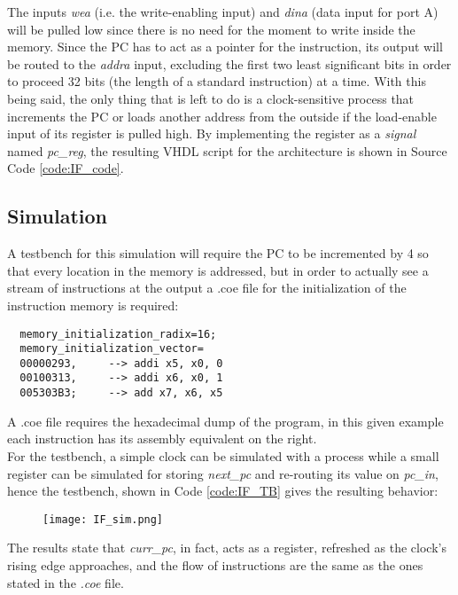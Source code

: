 The inputs \emph{wea} (i.e. the write-enabling input) and \emph{dina} (data input for port A) will be pulled low since there is no need for the moment to write inside the memory. 
Since the PC has to act as a pointer for the instruction, its output will be routed to the \emph{addra} input, excluding the first two least significant bits in order to proceed 32 bits (the length of a standard instruction) at a time.
With this being said, the only thing that is left to do is a clock-sensitive process that increments the PC or loads another address from the outside if the load-enable input of its register is pulled high. 
By implementing the register as a \emph{signal} named \emph{pc{\_}reg}, the resulting VHDL script for the architecture is shown in Source Code \ref{code:IF_code}.


\subsection{Simulation}
A testbench for this simulation will require the PC to be incremented by 4 so that every location in the memory is addressed, but in order to actually see a stream of instructions at the output a .coe file for the initialization of the instruction memory is required:

\begin{verbatim}
  memory_initialization_radix=16;
  memory_initialization_vector=
  00000293,     --> addi x5, x0, 0
  00100313,     --> addi x6, x0, 1
  005303B3;     --> add x7, x6, x5
\end{verbatim}
A .coe file requires the hexadecimal dump of the program, in this given example each instruction has its assembly equivalent on the right.\\
For the testbench, a simple clock can be simulated with a process while a small register can be simulated for storing \emph{next{\_}pc} and re-routing its value on \emph{pc{\_}in}, hence the testbench, shown in Code \ref{code:IF_TB} gives the resulting behavior:

\begin{figure}[h!]
  \texttt{[image: IF\_sim.png]}
\end{figure}

The results state that \emph{curr{\_}pc}, in fact, acts as a register, refreshed as the clock's rising edge approaches, and the flow of instructions are the same as the ones stated in the \emph{.coe} file. 
